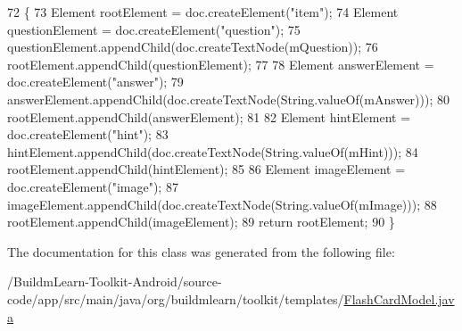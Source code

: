\begin{DoxyCode}
72                                         \{
73         Element rootElement = doc.createElement(\textcolor{stringliteral}{"item"});
74         Element questionElement = doc.createElement(\textcolor{stringliteral}{"question"});
75         questionElement.appendChild(doc.createTextNode(mQuestion));
76         rootElement.appendChild(questionElement);
77 
78         Element answerElement = doc.createElement(\textcolor{stringliteral}{"answer"});
79         answerElement.appendChild(doc.createTextNode(String.valueOf(mAnswer)));
80         rootElement.appendChild(answerElement);
81 
82         Element hintElement = doc.createElement(\textcolor{stringliteral}{"hint"});
83         hintElement.appendChild(doc.createTextNode(String.valueOf(mHint)));
84         rootElement.appendChild(hintElement);
85 
86         Element imageElement = doc.createElement(\textcolor{stringliteral}{"image"});
87         imageElement.appendChild(doc.createTextNode(String.valueOf(mImage)));
88         rootElement.appendChild(imageElement);
89         \textcolor{keywordflow}{return} rootElement;
90     \}
\end{DoxyCode}


The documentation for this class was generated from the following file\-:\begin{DoxyCompactItemize}
\item 
/\-Buildm\-Learn-\/\-Toolkit-\/\-Android/source-\/code/app/src/main/java/org/buildmlearn/toolkit/templates/\hyperlink{FlashCardModel_8java}{Flash\-Card\-Model.\-java}\end{DoxyCompactItemize}
